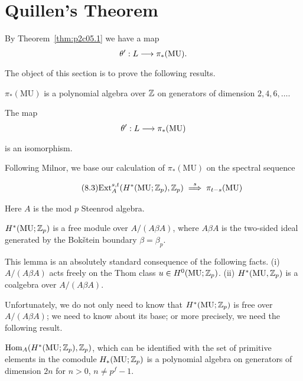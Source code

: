 \documentclass[../main]{subfiles}
\begin{document}
\chapter{Quillen's Theorem}
\label{sec:p2c8}
By Theorem~\ref{thm:p2c05.1} we have a map \[\theta' : L \lar{} \pi_\ast(\mathrm{MU}).\] The object of this section is to prove the following results. 

\begin{theorem}[Milnor]
\label{thm:p2c08.1}
$\pi_\ast(\mathrm{MU})$ is a polynomial algebra over $\mathbb{Z}$ on generators of dimension $2, 4, 6, \ldots$. 
\end{theorem}

\begin{theorem}[Quillen]
\label{thm:p2c08.2}
The map \[\theta' : L \lar{} \pi_\ast(\mathrm{MU})\] is an isomorphism.
\end{theorem}

Following Milnor, we base our calculation of $\pi_\ast(\mathrm{MU})$ on the spectral sequence

\begin{equation}
\tag{8.3}
\label{eqn:p2c08.3}
\mathrm{Ext}_A^{s, t} (H^\ast(\mathrm{MU}; \mathbb{Z}_p), \mathbb{Z}_p) \overset{s}{\implies} \pi_{t - s}(\mathrm{MU})
\end{equation}

Here $A$ is the mod $p$ Steenrod algebra.

\begin{lemma}
\label{lem:p2c08.4}
$H^\ast(\mathrm{MU}; \mathbb{Z}_p)$ is a free module over $A/(A \beta A)$, where $A \beta A$ is the two-sided ideal generated by the Bokštein boundary $\beta = \beta_p$. 
\end{lemma}

This lemma is an absolutely standard consequence of the following facts. (i) $A/(A \beta A)$ acts freely on the Thom class $u \in H^0(\mathrm {MU}; \mathbb{Z}_p)$. (ii) $H^\ast(\mathrm{MU}, \mathbb{Z}_p)$ is a coalgebra over $A/(A \beta A)$.

Unfortunately, we do not only need to know that $H^\ast(\mathrm{MU}; \mathbb{Z}_p)$ is free over $A/(A \beta A)$; we need to know about its base; or more precisely, we need the following result. 

\begin{lemma}
\label{lem:p2c08.5}
$\mathrm{Hom}_A(H^\ast(\mathrm{MU}; \mathbb{Z}_p), \mathbb{Z}_p)$, which can be identified with the set of primitive elements in the comodule $H_\ast(\mathrm{MU}; \mathbb{Z}_p)$ is a polynomial algebra on generators of dimension $2n$ for $n > 0$, $n \ne p^f - 1$.
\end{lemma}
\end{document}
